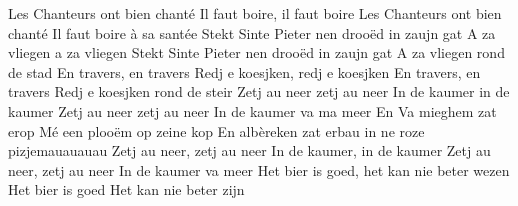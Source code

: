 \beginverse
Les Chanteurs ont bien chanté
Il faut boire, il faut boire
Les Chanteurs ont bien chanté
Il faut boire à sa santée
\endverse
\beginverse
Stekt Sinte Pieter nen drooëd in zaujn gat
A za vliegen a za vliegen
Stekt Sinte Pieter nen drooëd in zaujn gat
A za vliegen rond de stad 
\endverse
\beginverse
En travers, en travers
Redj e koesjken, redj e koesjken
En travers, en travers
Redj e koesjken rond de steir
\endverse
\beginverse
Zetj au neer zetj au neer
In de kaumer in de kaumer
Zetj au neer zetj au neer
In de kaumer va ma meer
\endverse
\beginverse
En Va mieghem zat erop 
Mé een plooëm op zeine kop
En albèreken zat erbau 
in ne roze pizjemauauauau
\endverse
\beginverse
Zetj au neer, zetj au neer
In de kaumer, in de kaumer
Zetj au neer, zetj au neer
In de kaumer va meer
\endverse
\beginverse
Het bier is goed, 
het kan nie beter wezen
Het bier is goed 
Het kan nie beter zijn
\endverse
\endsong